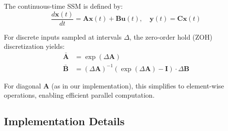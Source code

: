 \documentclass{article}
\begin{document}
The continuous-time SSM is defined by:
\begin{equation}
\frac{d\mathbf{x}(t)}{dt} = \mathbf{A}\mathbf{x}(t) + \mathbf{B}\mathbf{u}(t), \quad \mathbf{y}(t) = \mathbf{C}\mathbf{x}(t)
\end{equation}

For discrete inputs sampled at intervals $\Delta$, the zero-order hold (ZOH) discretization yields:
\begin{align}
\bar{\mathbf{A}} &= \exp(\Delta \mathbf{A}) \\
\bar{\mathbf{B}} &= (\Delta \mathbf{A})^{-1}(\exp(\Delta \mathbf{A}) - \mathbf{I}) \cdot \Delta \mathbf{B}
\end{align}

For diagonal $\mathbf{A}$ (as in our implementation), this simplifies to element-wise operations, enabling efficient parallel computation.

\subsection{Implementation Details}
\end{document}

